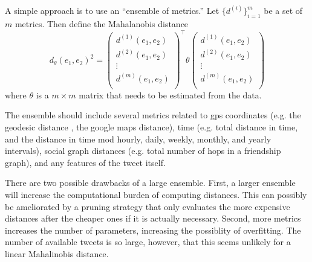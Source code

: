 \documentclass[sigconf,10pt]{acmart}
\newcommand{\R}{\mathbb{R}}
\newcommand{\trans}[1]{{#1}^{\top}}
\newcommand{\dist}{d}
\begin{document}
{\begin{enumerate}
        A simple approach is to use an ``ensemble of metrics.''
        Let $\{d^{(i)}\}_{i=1}^m$ be a set of $m$ metrics.
        Then define the Mahalanobis distance
        \begin{equation}
            \label{eq:mahalanobis}
            \dist_\theta(e_1,e_2) ^2
            =
            \trans{
            \begin{pmatrix}
                \dist^{(1)}(e_1,e_2) \\
                \dist^{(2)}(e_1,e_2) \\
                \vdots \\
                \dist^{(m)}(e_1,e_2) \\
            \end{pmatrix}
            }
            \theta
            \begin{pmatrix}
                \dist^{(1)}(e_1,e_2) \\
                \dist^{(2)}(e_1,e_2) \\
                \vdots \\
                \dist^{(m)}(e_1,e_2) \\
            \end{pmatrix}
        \end{equation}
        where $\theta$ is a $m\times m$ matrix that needs to be estimated from the data.

        The ensemble should include several metrics related to gps coordinates 
        (e.g. the geodesic distance \citep{vincenty1975direct}, the google maps distance),
        time 
        (e.g. total distance in time, and the distance in time mod hourly, daily, weekly, monthly, and yearly intervals),
        social graph distances
        (e.g. total number of hops in a friendship graph),
        and any features of the tweet itself.

        There are two possible drawbacks of a large ensemble.
        First, a larger ensemble will increase the computational burden of computing distances.
        This can possibly be ameliorated by a pruning strategy that only evaluates the more expensive distances after the cheaper ones if it is actually necessary.
        Second, more metrics increases the number of parameters, increasing the possiblity of overfitting.
        The number of available tweets is so large, however, that this seems unlikely for a linear Mahalinobis distance.


\end{enumerate}}
\end{document}
